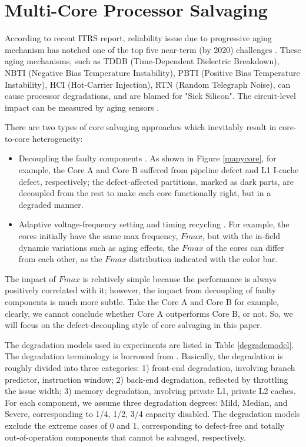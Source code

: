 \section{Multi-Core Processor Salvaging}
According to recent ITRS report, reliability issue due to progressive aging mechanism has notched one of the top five near-term (by 2020) challenges  \cite{itrs13}. These aging mechanisms, such as TDDB (Time-Dependent Dielectric Breakdown), NBTI (Negative Bias Temperature Instability), PBTI (Positive Bias Temperature Instability), HCI (Hot-Carrier Injection), RTN (Random Telegraph Noise),  can cause processor degradations, and are blamed for "Sick Silicon". The circuit-level impact can be measured by aging sensors \cite{siliconodometer} \cite{svfdtvlsi}.

There are two types of core salvaging approaches which inevitably result in core-to-core heterogeneity:
\begin{itemize}
    \item Decoupling the faulty components \cite{salvaging}. As shown in Figure \ref{manycore}, for example, the Core A and Core B suffered from pipeline defect and L1 I-cache defect, respectively; the defect-affected partitions, marked as dark parts,  are decoupled from the rest to make each core functionally right, but in a degraded manner.
    \item Adaptive voltage-frequency setting \cite{adaptive-core} and timing recycling \cite{ReviveNet}\cite{Recycle_07}. For example, the cores initially have the same max frequency, $Fmax$, but with the in-field dynamic variations such as aging effects, the $Fmax$ of the cores can differ from each other, as the $Fmax$ distribution indicated with the color bar.
\end{itemize}

The impact of $Fmax$ is relatively simple because the performance is always positively correlated with it; however, the impact  from decoupling of faulty components is much more subtle. Take the Core A and Core B for example, clearly, we cannot conclude whether Core A  outperforms Core B, or not. So, we will focus on the defect-decoupling style of core salvaging in this paper.

The degradation models used in experiments are listed in Table \ref{degrademodel}. The degradation terminology is borrowed from \cite{flicker}. Basically, the degradation is roughly divided  into three categories: 1) front-end degradation, involving branch predictor, instruction window; 2) back-end degradation, reflected by throttling the issue width;  3) memory degradation, involving private L1, private L2 caches.  For each component, we assume three degradation degrees: Mild, Median, and Severe, corresponding to 1/4, 1/2, 3/4 capacity disabled.  The degradation models exclude  the extreme cases of 0 and 1, corresponding to defect-free and  totally out-of-operation components that cannot be salvaged, respectively.

